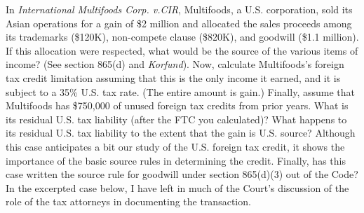 In \emph{International Multifoods Corp. v.\@ CIR}, Multifoods, a U.S. corporation, sold its Asian operations for a gain of \$2 million and allocated the sales proceeds among its trademarks (\$120K), non-compete clause (\$820K), and goodwill (\$1.1 million).  If this allocation were respected, what would be the source of the various items of income?  (See section 865(d) and \emph{Korfund}).  Now, calculate Multifoods's foreign tax credit limitation assuming that this is the only income it earned, and it is subject to a 35\% U.S. tax rate.  (The entire amount is gain.)  Finally, assume that Multifoods has \$750,000 of unused foreign tax credits from prior years.  What is its residual U.S. tax liability (after the FTC you calculated)?  What happens to its residual U.S. tax liability to the extent that the gain is U.S. source?  Although this case anticipates a bit our study of the U.S. foreign tax credit, it shows the importance of the basic source rules in determining the credit.  Finally, has this case written the source rule for goodwill under section 865(d)(3) out of the Code?  In the excerpted case below, I have left in much of the Court's discussion of the role of the tax attorneys in documenting the transaction. 

